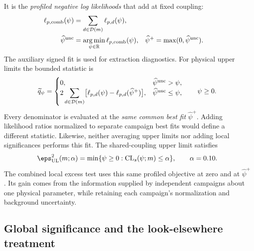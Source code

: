 It is the \emph{profiled negative log likelihoods} that add at fixed coupling:
\begin{align}
 \ell_{p,\rm comb}(\psi)
 &=\sum_{d\in\mathcal D(m)}\ell_{p,d}(\psi),
 \label{eq:v501-common-profile-sum}\\
 \widehat\psi^{\rm unc}
 &=\operatorname*{arg\,min}_{\psi\in\mathbb R}\ell_{p,\rm comb}(\psi),
 &\widehat\psi^+&=\max(0,\widehat\psi^{\rm unc}).
\end{align}
The auxiliary signed fit is used for extraction diagnostics. For physical
upper limits the bounded statistic is
\begin{equation}
 \widetilde q_{\psi}=
 \begin{cases}
 0,&\widehat\psi^{\rm unc}>\psi,\\
 2\displaystyle\sum_{d\in\mathcal D(m)}
 \bigl[\ell_{p,d}(\psi)-\ell_{p,d}(\widehat\psi^+)\bigr],
 &\widehat\psi^{\rm unc}\leq\psi,
 \end{cases}
 \qquad \psi\geq0.
 \label{eq:v501-common-bounded-statistic}
\end{equation}
Every denominator is evaluated at the \emph{same common best fit}
$\widehat\psi^+$. Adding likelihood ratios normalized to separate
campaign best fits would define a different statistic. Likewise, neither
averaging upper limits nor adding local significances performs this fit.
The shared-coupling upper limit satisfies
\begin{equation}
 \eps^2_{\rm UL}(m;\alpha)
 =\min\{\psi\geq0:\mathrm{CL}_s(\psi;m)\leq\alpha\},
 \qquad \alpha=0.10.
\end{equation}
The combined local excess test uses this same profiled objective at zero
and at $\widehat\psi^+$. Its gain comes from the information supplied by
independent campaigns about one physical parameter, while retaining each
campaign's normalization and background uncertainty.

\subsection{Global significance and the look-elsewhere treatment}

